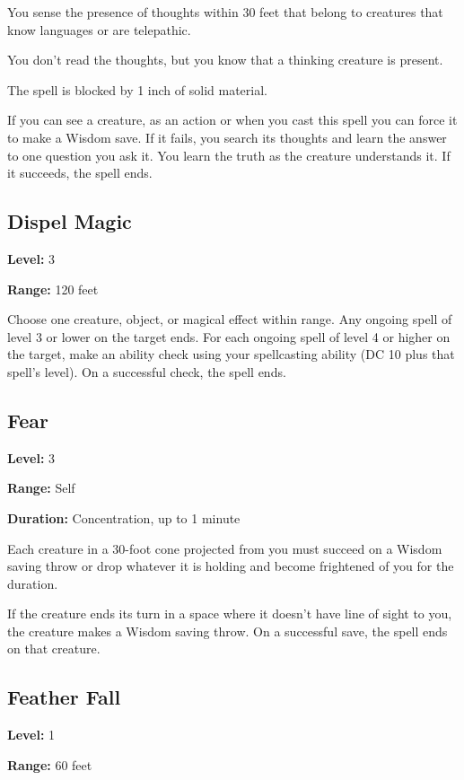 \documentclass[12pt,letterpaper,twocolumn,openany,nodeprecatedcode,bg=none]{dndbook}
\let\oldsubsection\subsection
\renewcommand{\subsection}[1]{%
  \needspace{5\baselineskip}%
  \oldsubsection{#1}%
}
\begin{document}
You sense the presence of thoughts within 30 feet that belong to
creatures that know languages or are telepathic.

You don't read the thoughts, but you know that a thinking creature is
present.

The spell is blocked by 1 inch of solid material.

If you can see a creature, as an action or when you cast this spell you
can force it to make a Wisdom save. If it fails, you search its thoughts
and learn the answer to one question you ask it. You learn the truth as
the creature understands it. If it succeeds, the spell ends.

\subsection{Dispel Magic}\label{dispel-magic}

\textbf{Level:} 3

\textbf{Range:} 120 feet

Choose one creature, object, or magical effect within range. Any ongoing
spell of level 3 or lower on the target ends. For each ongoing spell of
level 4 or higher on the target, make an ability check using your
spellcasting ability (DC 10 plus that spell's level). On a successful
check, the spell ends.

\subsection{Fear}\label{fear}

\textbf{Level:} 3

\textbf{Range:} Self

\textbf{Duration:} Concentration, up to 1 minute

Each creature in a 30-foot cone projected from you must succeed on a
Wisdom saving throw or drop whatever it is holding and become frightened
of you for the duration.

If the creature ends its turn in a space where it doesn't have line of
sight to you, the creature makes a Wisdom saving throw. On a successful
save, the spell ends on that creature.

\subsection{Feather Fall}\label{feather-fall}

\textbf{Level:} 1

\textbf{Range:} 60 feet
\end{document}
